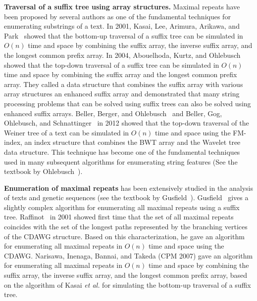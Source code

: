 \textbf{Traversal of a suffix tree using array structures.} Maximal repeats have been proposed by several authors as one of the fundamental techniques for enumerating substrings of a text. In 2001, Kasai, Lee, Arimura, Arikawa, and Park~\cite{kasai:lee2001lcp:linear} showed that the bottom-up traversal of a suffix tree can be simulated in $O(n)$ time and space by combining the suffix array, the inverse suffix array, and the longest common prefix array. In 2004, Abouelhoda, Kurtz, and Ohlebusch~\cite{abouelhoda2004replacing} showed that the top-down traversal of a suffix tree can be simulated in $O(n)$ time and space by combining the suffix array and the longest common prefix array. They called a data structure that combines the suffix array with various array structures an enhanced suffix array and demonstrated that many string processing problems that can be solved using suffix trees can also be solved using enhanced suffix arrays.
Beller, Berger, and Ohlebusch~\cite{beller:berger2012space:efficient:bbo} and Beller, Gog, Ohlebusch, and Schnattinger~\cite{bellergogohlebusch2013computing} in 2012 showed that the top-down traversal of the Weiner tree of a text can be simulated in $O(n)$ time and space using the FM-index, an index structure that combines the BWT array and the Wavelet tree data structure. This technique has become one of the fundamental techniques used in many subsequent algorithms for enumerating string features (See the textbook by Ohlebusch~\cite{ohlebusch2013bookbioinfo}).

\textbf{Enumeration of maximal repeats} has been extensively studied in the analysis of texts and genetic sequences (see the textbook by Gusfield~\cite{gusfield1997algorithms}). Gusfield~\cite[Section 7.12.1]{gusfield1997algorithms} gives a slightly complex algorithm for enumerating all maximal repeats using a suffix tree.
Raffinot~\cite{raffinot2001maximal} in 2001 showed first time that the set of all maximal repeats coincides with the set of the longest paths represented by the branching vertices of the CDAWG structure. Based on this characterization, he gave an algorithm for enumerating all maximal repeats in $O(n)$ time and space using the CDAWG.
Narisawa, Inenaga, Bannai, and Takeda (CPM 2007) gave an algorithm for enumerating all maximal repeats in $O(n)$ time and space by combining the suffix array, the inverse suffix array, and the longest common prefix array, based on the algorithm of Kasai \textit{et al.} for simulating the bottom-up traversal of a suffix tree.

